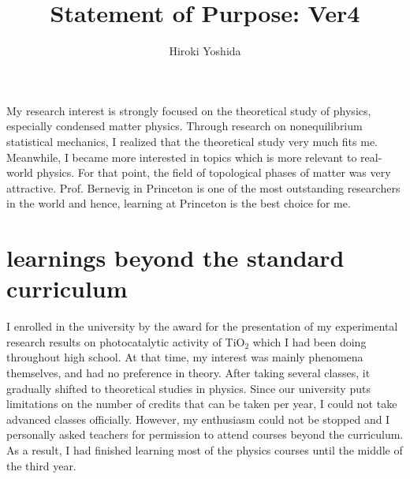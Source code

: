 \documentclass[a4]{article}
\title{Statement of Purpose: Ver4}
\author{Hiroki Yoshida}
\date{}
\begin{document}
\maketitle

My research interest is strongly focused on the theoretical study of physics, especially condensed matter physics. Through research on nonequilibrium statistical mechanics, I realized that the theoretical study very much fits me. Meanwhile, I became more interested in topics which is more relevant to real-world physics. For that point, the field of topological phases of matter was very attractive. Prof. Bernevig in Princeton is one of the most outstanding researchers in the world and hence, learning at Princeton is the best choice for me.\par

\section{learnings beyond the standard curriculum}
I enrolled in the university by the award for the presentation of my experimental research results on photocatalytic activity of TiO$_2$ which I had been doing throughout high school. At that time, my interest was mainly phenomena themselves, and had no preference in theory. After taking several classes, it gradually shifted to theoretical studies in physics. Since our university puts limitations on the number of credits that can be taken per year, I could not take advanced classes officially. However, my enthusiasm could not be stopped and I personally asked teachers for permission to attend courses beyond the curriculum. As a result, I had finished learning most of the physics courses until the middle of the third year.\par
\end{document}
